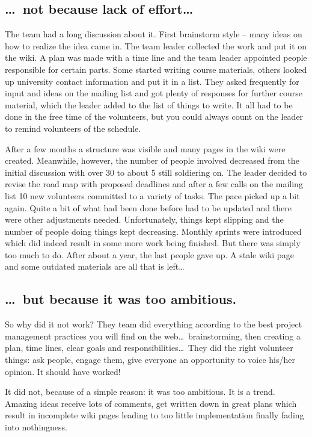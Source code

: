 \subsection*{\dots\ not because lack of effort\dots}
The team had a long discussion about it. First brainstorm style -- many ideas on
how to realize the idea came in. The team leader collected the work and put it
on the wiki. A plan was made with a time line and the team leader appointed
people responsible for certain parts. Some started writing  course materials,
others looked up university contact information and put it in a list. They asked
frequently for input and ideas on the mailing list and got plenty of responses
for further course material, which the leader added to the list of things to
write. It all had to be done in the free time of the volunteers, but you could
always count on the leader to remind volunteers of the schedule.

After a few months a structure was visible and many pages in the wiki were
created. Meanwhile, however, the number of people involved decreased from the
initial discussion with over 30 to about 5 still soldiering on. The leader
decided to revise the road map with proposed deadlines and after a few calls on
the mailing list 10 new volunteers committed to a variety of tasks. The pace
picked up a bit again. Quite a bit of what had been done before had to be
updated and there were other adjustments needed. Unfortunately, things kept
slipping and the number of people doing things kept decreasing. Monthly sprints
were introduced which did indeed result in some more work being finished. But
there was simply too much to do. After about a year, the last people gave up. A
stale wiki page and some outdated materials are all that is left\dots

\subsection*{\dots\ but because it was too ambitious.}
So why did it not work? They team did everything according to the best project
management practices you will find on the web\dots\ brainstorming, then creating
a plan, time lines, clear goals and responsibilities\dots\ They did the right
volunteer things: ask people, engage them, give everyone an opportunity to voice
his/her opinion. It should have worked!

It did not, because of a simple reason: it was too ambitious. It is a trend.
Amazing ideas receive lots of comments, get written down in great plans which
result in incomplete wiki pages leading to too little implementation finally
fading into nothingness.


